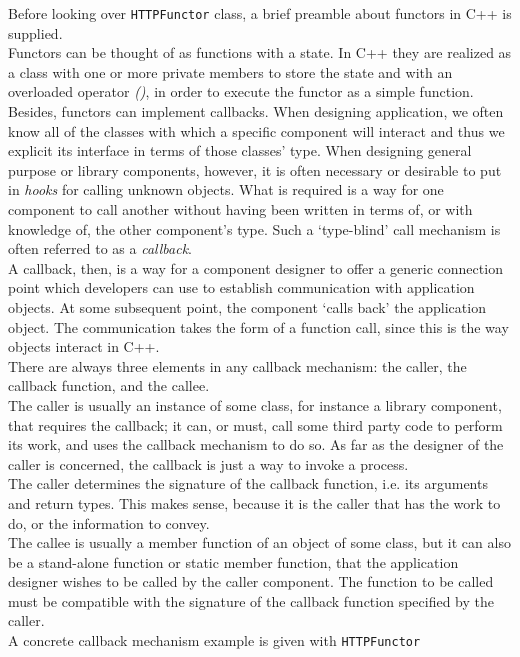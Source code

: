 Before looking over \texttt{HTTPFunctor} class, a brief preamble
about functors in C++ is supplied.
\\
Functors can be thought of as functions with a state. In C++ they
are realized
as a class with one or more private members to store the state
and with an overloaded operator \textit{()}, in order to execute the
functor as a simple function.
\\
Besides, functors can implement callbacks.
When designing application, we often know all of the classes
with which a specific component will interact and thus we explicit its
interface in terms of those classes' type. When designing general purpose
or library components, however, it is often necessary or desirable
to put in \textit{hooks} for calling unknown objects. What is required is
a way for one component to call another without having been written
in terms of, or with knowledge of, the other component's type. Such a
`type-blind' call mechanism is often referred to as a \textit{callback}.
\\
A callback, then, is a way for a component designer to offer a generic
connection point which developers can use to establish communication
with application objects. At some subsequent point, the component `calls
back' the application object. The communication takes the form of a
function call, since this is the way objects interact in C++.
\\
There are always three elements in any callback mechanism: the caller, the
callback function, and the callee.
\\
The caller is usually an instance of some class, for instance a library
component, that requires the callback; it can, or must, call some
third party code to perform its work, and uses the callback mechanism
to do so. As far as the designer of the caller is concerned, the callback
is just a way to invoke a process.
\\
The caller determines the signature of the callback function, i.e. its
arguments and return types. This makes sense, because it is the caller
that has the work to do, or the information to convey.
\\
The callee is usually a member function of an object of some class, but it
can also be a stand-alone function or static member function, that the
application designer wishes to be called by the caller component.
The function to be called must be compatible with the
signature of the callback function specified by the caller.
\\
A concrete callback mechanism example is given with \texttt{HTTPFunctor}
